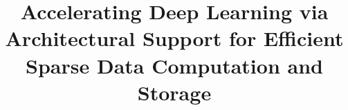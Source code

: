 \documentclass{sig-alternate}
\begin{document}
\title{Accelerating Deep Learning via Architectural Support for Efficient Sparse Data Computation and Storage}
\date{}
\maketitle
\thispagestyle{firstpage}
\pagestyle{plain}






%
%
%










\end{document}
